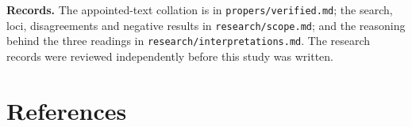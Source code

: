 {\textbf{Records.} The appointed-text collation is in \texttt{propers/verified.md};
the search, loci, disagreements and negative results in
\texttt{research/scope.md}; and the reasoning behind the three readings in
\texttt{research/interpretations.md}. The research records were reviewed
independently before this study was written.
\par}

\section*{References}
\label{sec:references}

